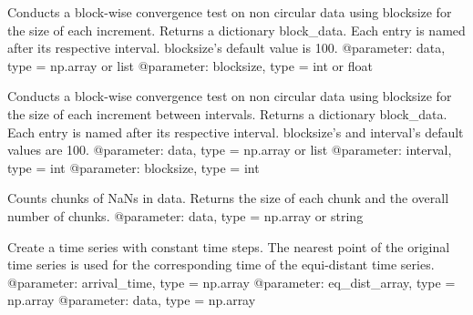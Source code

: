 \documentclass[letterpaper,10pt,english]{sphinxmanual}
\begin{document}

\begin{fulllineitems}
\label{\detokenize{index:windtunnel.convergence_test_1}}
Conducts a block-wise convergence test on non circular data using 
blocksize for the size of each increment. Returns a dictionary block\_data.
Each entry is named after its respective interval. blocksize’s default 
value is 100.
@parameter: data, type = np.array or list
@parameter: blocksize, type = int or float

\end{fulllineitems}


\begin{fulllineitems}
\label{\detokenize{index:windtunnel.convergence_test_2}}
Conducts a block-wise convergence test on non circular data using 
blocksize for the size of each increment between intervals. Returns a 
dictionary block\_data. Each entry is named after its respective interval.
blocksize’s and interval’s default values are 100.
@parameter: data, type = np.array or list
@parameter: interval, type = int
@parameter: blocksize, type = int

\end{fulllineitems}


\begin{fulllineitems}
\label{\detokenize{index:windtunnel.count_nan_chunks}}
Counts chunks of NaNs in data. Returns the size of each chunk and
the overall number of chunks.
@parameter: data, type = np.array or string

\end{fulllineitems}


\begin{fulllineitems}
\label{\detokenize{index:windtunnel.equ_dist_ts}}
Create a time series with constant time steps. The nearest point of the
original time series is used for the corresponding time of the equi-distant
time series.
@parameter: arrival\_time, type = np.array
@parameter: eq\_dist\_array, type = np.array
@parameter: data, type = np.array

\end{fulllineitems}
\end{document}
